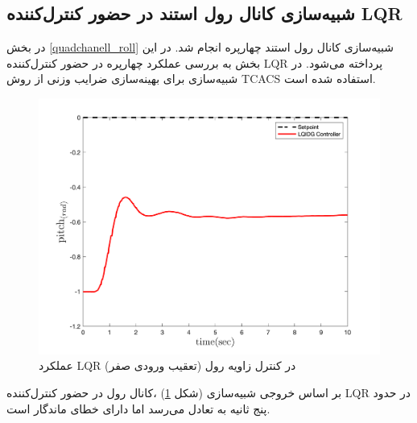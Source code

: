 \subsection{شبیه‌سازی کانال رول استند در حضور کنترل‌کننده LQR}\label{roll_lqr_section}
در بخش
\ref{quadchanell_roll}
شبیه‌سازی کانال رول استند چهارپره انجام شد. در این بخش به بررسی عملکرد چهارپره در حضور کنترل‌کننده LQR پرداخته می‌شود. در شبیه‌سازی برای بهینه‌سازی ضرایب وزنی از روش
TCACS \cite{Karimi2010}
استفاده شده است.
\begin{figure}[H]\label{lqr_roll_fig}
	\includegraphics[width=12cm]{../Figures/Calibration/LQR/Pitch/lqr_pitch.png}
	\centering
	\caption{عملكرد LQR در کنترل زاويه رول (تعقیب ورودی صفر)}
\end{figure}
بر اساس خروجی شبیه‌سازی (شکل
\ref{lqr_roll_fig})
،کانال رول در حضور کنترل‌کننده LQR در حدود پنج ثانیه به تعادل می‌رسد اما دارای خطای ماندگار است. 